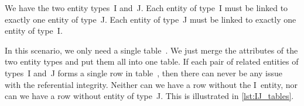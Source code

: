 %
%
\label{sec:rm:ij}%
%
%
%
We have the two entity types~I and~J.
Each entity of type~I must be linked to exactly one entity of type~J.
Each entity of type~J must be linked to exactly one entity of type~I.

In this scenario, we only need a single table~\cite{S2024D:MEDTRDM}.
We just merge the attributes of the two entity types and put them all into one table.
If each pair of related entities of types~I and~J forms a single row in table~, then there can never be any issue with the referential integrity.
Neither can we have a row without the I~entity, nor can we have a row without entity of type~J.
This is illustrated in \cref{lst:IJ_tables}.%
%
\FloatBarrier%
\endhsection%
%
